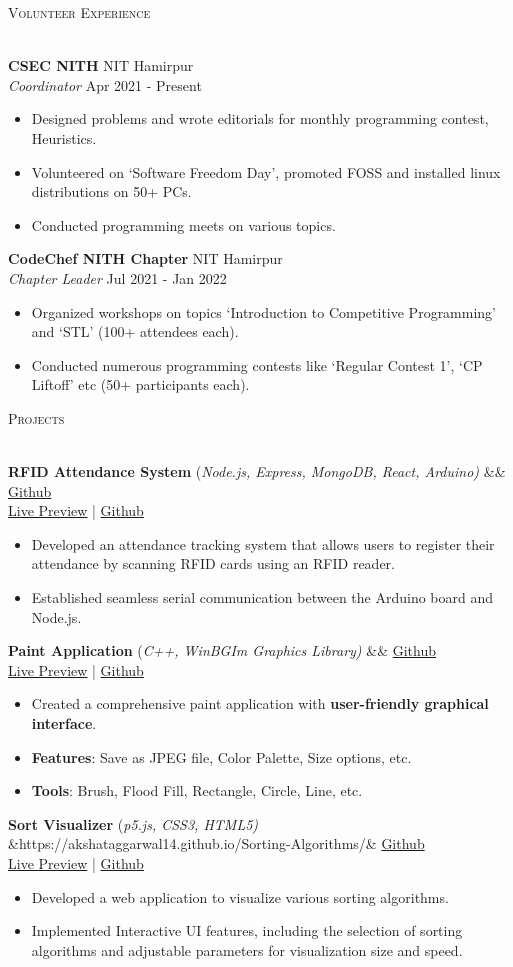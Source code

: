 \documentclass[a4paper]{article}
\newcommand{\bulletSep} { \vspace{1.5mm} }
\newcommand{\sectionSep} { \vspace{3mm} }
\newcommand{\lineunder} {
    \vspace*{-8pt} \\
    \hspace*{-15pt} \hrulefill \\
}
\newcommand{\header} [1] {
    {\hspace*{-18pt}\vspace*{6pt} {
        \fontfamily{qcs}\selectfont \large \scshape #1
    }}
    \vspace*{-6pt} \lineunder
    \vspace{1mm}
}
\newcommand{\experienceItem}[5]{
    \textbf{#1} \hfill #2 \\
    \textit{#3} \hfill #4 \\
    \begin{itemize}
        #5
    \end{itemize}
}
\newcommand{\projectItem}[5]{
    {\textbf{#1}} {(\sl #2)}\hfill
    \ifx&#3&%
    \href{#4}{Github}\\
    \else
    \href{#3}{Live Preview} | \href{#4}{Github}\\
    \fi
    \begin{itemize}
        #5
    \end{itemize}
}
\begin{document}
\header{Volunteer Experience}

\experienceItem{CSEC NITH}{NIT Hamirpur}{Coordinator}{Apr 2021 - Present}{
    \item Designed problems and wrote editorials for monthly programming contest, Heuristics.
    \item Volunteered on `Software Freedom Day', promoted FOSS and installed linux distributions on 50+ PCs.
    \item Conducted programming meets on various topics.
}
\bulletSep

\experienceItem{CodeChef NITH Chapter}{NIT Hamirpur}{Chapter Leader}{Jul 2021 - Jan 2022}{
    \item Organized workshops on topics `Introduction to Competitive Programming' and `STL' (100+ attendees each).
    \item Conducted numerous programming contests like `Regular Contest 1', `CP Liftoff' etc (50+ participants each).
}
\sectionSep


\header{Projects}

\projectItem{RFID Attendance System}{Node.js, Express, MongoDB, React, Arduino}{}{https://github.com/AkshatAggarwal14/RFID-Attendance-system}{
    \item Developed an attendance tracking system that allows users to register their attendance by scanning RFID cards using an RFID reader.
    \item Established seamless serial communication between the Arduino board and Node.js.
}
\bulletSep

\projectItem{Paint Application}{C++, WinBGIm Graphics Library}{}{https://github.com/Sahil-187/Paint-Application}{
    \item Created a comprehensive paint application with \textbf{user-friendly graphical interface}.
    \item \textbf{Features}: Save as JPEG file, Color Palette, Size options, etc.
    \item \textbf{Tools}: Brush, Flood Fill, Rectangle, Circle, Line, etc.
}
\bulletSep

\projectItem{Sort Visualizer}{p5.js, CSS3, HTML5}{https://akshataggarwal14.github.io/Sorting-Algorithms/}{https://github.com/AkshatAggarwal14/Sorting-Algorithms/}{
    \item Developed a web application to visualize various sorting algorithms.
    \item Implemented Interactive UI features, including the selection of sorting algorithms and adjustable parameters for visualization size and speed.
}\bulletSep
\end{document}

